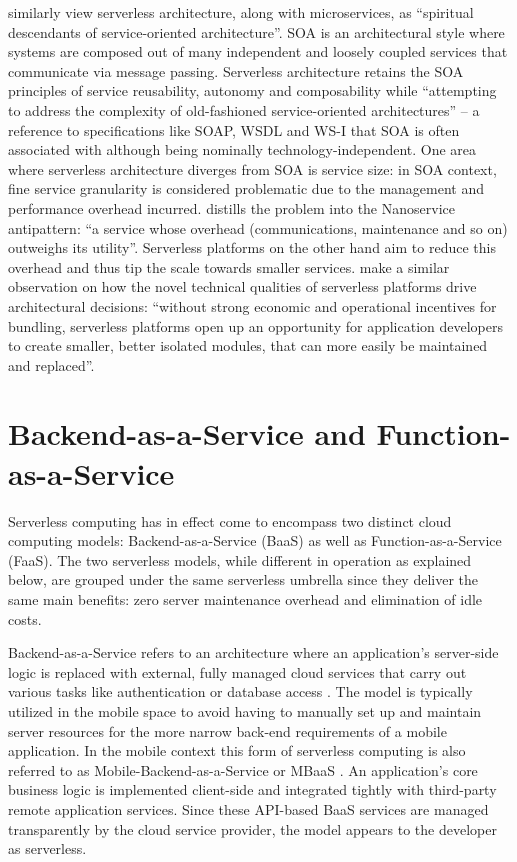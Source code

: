 \textcite{sbarski2017serverless} similarly view serverless architecture, along with microservices, as ``spiritual descendants of service-oriented architecture''. SOA is an architectural style where systems are composed out of many independent and loosely coupled services that communicate via message passing. Serverless architecture retains the SOA principles of service reusability, autonomy and composability while ``attempting to address the complexity of old-fashioned service-oriented architectures'' -- a reference to specifications like SOAP, WSDL and WS-I that SOA is often associated with although being nominally technology-independent. One area where serverless architecture diverges from SOA is service size: in SOA context, fine service granularity is considered problematic due to the management and performance overhead incurred. \textcite{rotem12soa} distills the problem into the Nanoservice antipattern: ``a service whose overhead (communications, maintenance and so on) outweighs its utility''. Serverless platforms on the other hand aim to reduce this overhead and thus tip the scale towards smaller services. \textcite{adzic2017serverless} make a similar observation on how the novel technical qualities of serverless platforms drive architectural decisions: ``without strong economic and operational incentives for bundling, serverless platforms open up an opportunity for application developers to create smaller, better isolated modules, that can more easily be maintained and replaced''.

\section{Backend-as-a-Service and Function-as-a-Service} \label{sec:faasbaas}

Serverless computing has in effect come to encompass two distinct cloud computing models: Backend-as-a-Service (BaaS) as well as Function-as-a-Service (FaaS). The two serverless models, while different in operation as explained below, are grouped under the same serverless umbrella since they deliver the same main benefits: zero server maintenance overhead and elimination of idle costs. \parencite{cncf18serverlessWG}

Backend-as-a-Service refers to an architecture where an application's server-side logic is replaced with external, fully managed cloud services that carry out various tasks like authentication or database access \parencite{buyya2017manifesto}. The model is typically utilized in the mobile space to avoid having to manually set up and maintain server resources for the more narrow back-end requirements of a mobile application. In the mobile context this form of serverless computing is also referred to as Mobile-Backend-as-a-Service or MBaaS \parencite{sareen13cloudTypes}. An application's core business logic is implemented client-side and integrated tightly with third-party remote application services. Since these API-based BaaS services are managed transparently by the cloud service provider, the model appears to the developer as serverless.

